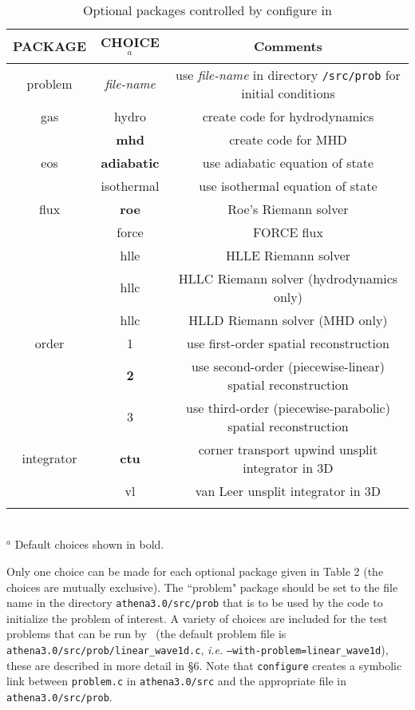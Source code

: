 \begin{table}[ht]
\caption{Optional packages controlled by configure in \ath}
\begin{tabular}{|c|c|c|} \hline \hline
PACKAGE & CHOICE$^{a}$ & Comments \\ \hline
problem & {\it file-name} & use {\it file-name} in directory {\tt /src/prob} for initial conditions \\ \hline
gas    & hydro  & create code for hydrodynamics \\
       & {\bf mhd}    & create code for MHD \\ \hline
eos    & {\bf adiabatic} & use adiabatic equation of state \\
       & isothermal & use isothermal equation of state \\ \hline
flux & {\bf roe} & Roe's Riemann solver \\
     & force & FORCE flux \\
     & hlle & HLLE Riemann solver \\
     & hllc & HLLC Riemann solver (hydrodynamics only) \\
     & hllc & HLLD Riemann solver (MHD only) \\ \hline
order & 1 & use first-order spatial reconstruction \\
      & {\bf 2} & use second-order (piecewise-linear) spatial reconstruction \\
      & 3 & use third-order (piecewise-parabolic) spatial reconstruction \\ \hline
integrator & {\bf ctu} & corner transport upwind unsplit integrator in 3D \\
           & vl & van Leer unsplit integrator in 3D \\
\\ \hline
\end{tabular} \\
$^{a}$ Default choices shown in bold.
\end{table}

Only one choice can be made for each optional package given in Table 2
(the choices are mutually exclusive).  The ``problem" package should be
set to the file name in the directory {\tt athena3.0/src/prob} that is
to be used by the code to initialize the problem of interest.  A variety
of choices are included for the test problems that can be run by \ath\
(the default problem file is {\tt athena3.0/src/prob/linear\_wave1d.c},
{\it i.e.} {\tt --with-problem=linear\_wave1d}), these are described in
more detail in \S 6.  Note that {\tt configure} creates a symbolic link
between {\tt problem.c} in {\tt athena3.0/src} and the appropriate file
in {\tt athena3.0/src/prob}.

